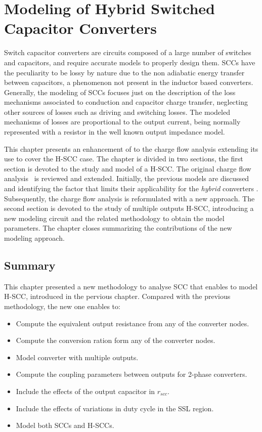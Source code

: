 \chapter[Modeling of H-SCC]{Modeling of Hybrid Switched Capacitor Converters}
\label{ch:modeling}
Switch capacitor converters are circuits composed of a large number of switches and capacitors, and require accurate models to properly design them. SCCs have the peculiarity to be lossy by nature due to the non adiabatic energy transfer between capacitors, a phenomenon not present in the inductor based converters. Generally, the modeling of SCCs focuses just on the description of the loss mechanisms associated to conduction and capacitor charge transfer, neglecting other sources of losses such as driving and switching losses. The modeled mechanisms of losses are proportional to the output current, being  normally represented with a resistor in the well known output impedance model.

This chapter presents an enhancement of  to the charge flow analysis extending its use to cover the H-SCC case.   The chapter is divided in two sections, the first section is devoted to the study and model of a H-SCC. The original charge flow analysis~\cite{95Makowski,Seeman:EECS-2009-78} is reviewed and extended. Initially, the previous models are discussed and identifying the factor that limits their applicability for the \emph{hybrid} converters . Subsequently, the charge flow analysis is reformulated with a new approach. The second section is devoted to the study of multiple outputs H-SCC, introducing a new modeling circuit and the related methodology to obtain the model parameters. The chapter closes summarizing the contributions of the new modeling approach.




\section{Summary}
This chapter presented a new methodology to analyse SCC that enables to model H-SCC, introduced in the pervious chapter. Compared with the previous methodology, the new one enables to:
\begin{itemize}
  \item Compute the equivalent output resistance from any of the converter nodes.
  \item Compute the conversion ration form any of the converter nodes.
  \item Model converter with multiple outputs.
  \item Compute the coupling parameters between outputs for 2-phase converters.
  \item Include the effects of the output capacitor in $r_{scc}$.
  \item Include the effects of variations in duty cycle in the SSL region.
  \item Model both SCCs and H-SCCs.
\end{itemize}


\clearpage

 